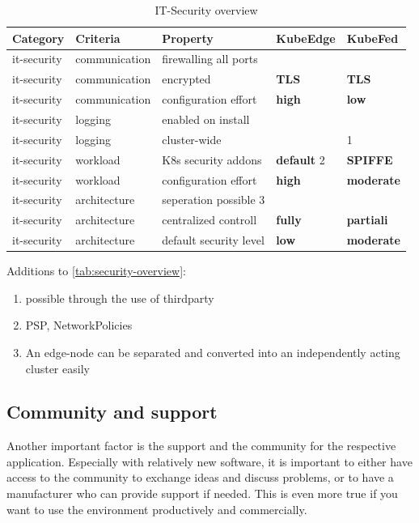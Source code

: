 \documentclass[MIC,Master,english]{twbook}%
\newcommand{\cmark}{\ding{51}}%
\newcommand{\xmark}{\ding{55}}%
\begin{document}
\begin{table}[ht]
    \begin{center}
        \begin{tabular}{|l|l|l|l|l|}
            \hline
            Category & Criteria & Property & \textbf{KubeEdge} & \textbf{KubeFed} \\
            \hline
            it-security & communication & firewalling all ports & \cmark & \xmark \\
            it-security & communication & encrypted & \textbf{TLS} & \textbf{TLS} \\
            it-security & communication & configuration effort & \textbf{high} & \textbf{low} \\
            it-security & logging & enabled on install & \xmark & \cmark \\
            it-security & logging & cluster-wide & \cmark & \xmark \tiny{1} \\
            it-security & workload & K8s security addons & \textbf{default} \tiny{2} & \textbf{SPIFFE} \cite{ke-secure-fw} \\
            it-security & workload & configuration effort & \textbf{high} & \textbf{moderate} \\
            it-security & architecture & seperation possible \tiny{3} & \xmark & \cmark \\
            it-security & architecture & centralized controll & \textbf{fully} & \textbf{partiali} \\
            it-security & architecture & default security level & \textbf{low} & \textbf{moderate} \\
            \hline
        \end{tabular}
        \caption{IT-Security overview}
        \label{tab:security-overview}
    \end{center}
\end{table}

Additions to \autoref{tab:security-overview}:
\begin{enumerate}
    \itemsep0em
    \item possible through the use of thirdparty
    \item \ac{PSP}, NetworkPolicies
    \item An edge-node can be separated and converted into an independently acting cluster easily
\end{enumerate}

\subsection{Community and support}
Another important factor is the support and the community for the respective application. Especially with relatively new software, it is important to either have access to the community to exchange ideas and discuss problems, or to have a manufacturer who can provide support if needed. This is even more true if you want to use the environment productively and commercially.
\end{document}
